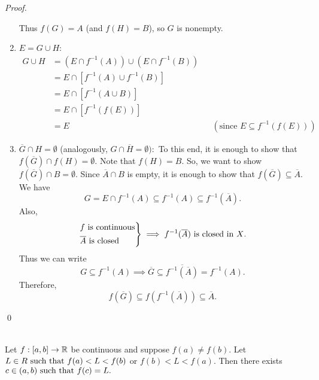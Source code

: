 \begin{proof}
\begin{enumerate}[$(1)$]
        Thus $f(G) = A$ (and $f(H) = B$), so $G$ is nonempty.

        \item $E = G \cup H$:
        \begin{align*}
            G\cup H &= (E \cap f^{-1}(A)) \cup (E \cap f^{-1}(B)) \\
            &= E \cap [f^{-1}(A) \cup f^{-1}(B)] \\
            &= E \cap [f^{-1}(A \cup B)] \\
            &= E \cap [f^{-1}(f(E))] \\
            &= E &&\left(\text{since } E \subseteq f^{-1}(f(E))\right)
        \end{align*}

        \item $\overline{G} \cap H = \emptyset$ (analogously, $G\cap \overline{H}=\emptyset):$ To this end, it is enough to show that $f(\overline{G})\cap f(H) = \emptyset.$ Note that $f(H) = B$. So, we want to show $f(\overline{G})\cap B = \emptyset$. Since $\overline{A}\cap B$ is empty, it is enough to show that $f(\overline{G}) \subseteq \overline{A}$. We have
        $$G = E \cap f^{-1}(A) \subseteq f^{-1}(A) \subseteq f^{-1}(\overline{A}).$$
        Also,
        $$\begin{rcases*}
            f \text{ is continuous} \\
            \overline{A} \text{ is closed}
        \end{rcases*} \implies f^{-1}(\overline{A}) \text{ is closed in $X$.}$$
        Thus we can write
        $$G \subseteq f^{-1}(A) \implies \overline{G} \subseteq \overline{f^{-1}(\overline{A})} = f^{-1}(A).$$
        Therefore,
        $$f(\overline{G}) \subseteq f(f^{-1}(\overline{A})) \subseteq \overline{A}.$$
    \end{enumerate}
    \qed
\end{proof}

\begin{theorem} \leavevmode \\
    \label{thm4.23}
    Let $f:[a,b] \to \mathbb{R}$ be continuous and suppose $f(a) \not = f(b)$. Let $L \in R \text{ such that } f(a) < L < f(b)$ or $f(b) < L < f(a)$. Then there exists $c \in (a,b) \text{ such that } f(c) = L.$
\end{theorem}

